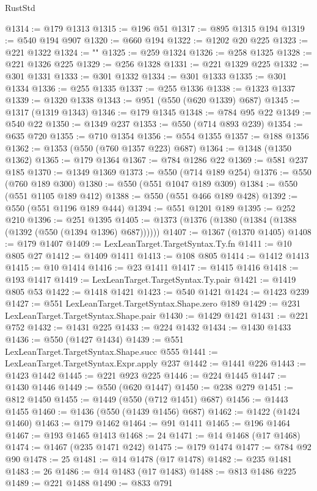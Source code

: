 \begin{lexlean}{RustStd}
\begin{coremodule}
@1314 := @179 @1313
@1315 := @196 @51
@1317 := @895 @1315 @194
@1319 := @540 @194 @907
@1320 := @660 @194
@1322 := @1202 @20 @225
@1323 := @221 @1322
@1324 := ""
@1325 := @259 @1324
@1326 := @258 @1325
@1328 := @221 @1326 @225
@1329 := @256 @1328
@1331 := @221 @1329 @225
@1332 := @301 @1331
@1333 := @301 @1332
@1334 := @301 @1333
@1335 := @301 @1334
@1336 := @255 @1335
@1337 := @255 @1336
@1338 := @1323 @1337
@1339 := @1320 @1338
@1343 := @951 (@550 (@620 @1339) @687)
@1345 := @1317 (@1319 @1343)
@1346 := @179 @1345
@1348 := @784 @95 @22
@1349 := @540 @22
@1350 := @1349 @237
@1353 := @550 (@714 @893 @239)
@1354 := @635 @720
@1355 := @710 @1354
@1356 := @554 @1355
@1357 := @188 @1356
@1362 := @1353 (@550 (@760 @1357 @223) @687)
@1364 := @1348 (@1350 @1362)
@1365 := @179 @1364
@1367 := @784 @1286 @22
@1369 := @581 @237 @185
@1370 := @1349 @1369
@1373 := @550 (@714 @189 @254)
@1376 := @550 (@760 @189 @300)
@1380 := @550 (@551 @1047 @189 @309)
@1384 := @550 (@551 @1105 @189 @412)
@1388 := @550 (@551 @466 @189 @428)
@1392 := @550 (@551 @1196 @189 @444)
@1394 := @551 @1201 @189
@1395 := @252 @210
@1396 := @251 @1395
@1405 := @1373 (@1376 (@1380 (@1384 (@1388 (@1392 (@550 (@1394 @1396) @687))))))
@1407 := @1367 (@1370 @1405)
@1408 := @179 @1407
@1409 := LexLeanTarget.TargetSyntax.Ty.fn
@1411 := @10 @805 @27
@1412 := @1409 @1411
@1413 := @108 @805
@1414 := @1412 @1413
@1415 := @10 @1414
@1416 := @23 @1411
@1417 := @1415 @1416
@1418 := @193 @1417
@1419 := LexLeanTarget.TargetSyntax.Ty.pair
@1421 := @1419 @805 @53
@1422 := @1418 @1421
@1423 := @540 @1421
@1424 := @1423 @239
@1427 := @551 LexLeanTarget.TargetSyntax.Shape.zero @189
@1429 := @231 LexLeanTarget.TargetSyntax.Shape.pair
@1430 := @1429 @1421
@1431 := @221 @752
@1432 := @1431 @225
@1433 := @224 @1432
@1434 := @1430 @1433
@1436 := @550 (@1427 @1434)
@1439 := @551 LexLeanTarget.TargetSyntax.Shape.succ @555
@1441 := LexLeanTarget.TargetSyntax.Expr.apply @237
@1442 := @1441 @226
@1443 := @1423 @1442
@1445 := @221 @923 @225
@1446 := @224 @1445
@1447 := @1430 @1446
@1449 := @550 (@620 @1447)
@1450 := @238 @279
@1451 := @812 @1450
@1455 := @1449 (@550 (@712 @1451) @687)
@1456 := @1443 @1455
@1460 := @1436 (@550 (@1439 @1456) @687)
@1462 := @1422 (@1424 @1460)
@1463 := @179 @1462
@1464 := @91 @1411
@1465 := @196 @1464
@1467 := @193 @1465 @1413
@1468 := 24
@1471 := @14 @1468 (@17 @1468)
@1474 := @1467 (@235 @1471 @242)
@1475 := @179 @1474
@1477 := @784 @92 @90
@1478 := 25
@1481 := @14 @1478 (@17 @1478)
@1482 := @235 @1481
@1483 := 26
@1486 := @14 @1483 (@17 @1483)
@1488 := @813 @1486 @225
@1489 := @221 @1488
@1490 := @833 @791

\end{coremodule}
\end{lexlean}
